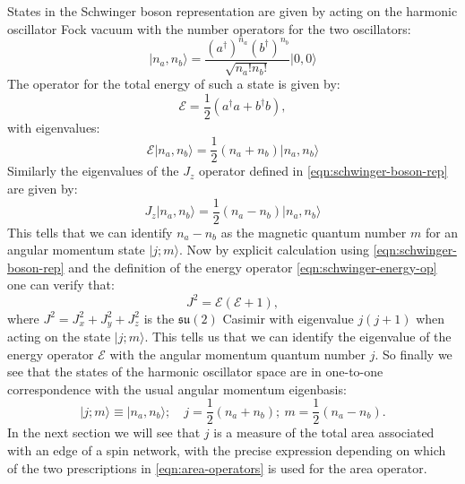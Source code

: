 \documentclass[twocolumn,draft,aps,nofootinbib,nobibnotes,final]{revtex4-2}
\newcommand{\mc}[1]{\mathcal{#1}}
\newcommand{\mf}[1]{\mathfrak{#1}}
\newcommand{\ket}[1]{\vert #1 \rangle}
\newcommand{\onehalf}{\frac{1}{2}}
\begin{document}
States in the Schwinger boson representation are given by acting on the harmonic oscillator Fock vacuum with the number operators for the two oscillators:
\begin{equation}\label{eqn:schwinger-states}
	\ket{n_a, n_b} = \frac{(a^\dag)^{n_a} (b^\dag)^{n_b}}{\sqrt{n_a ! n_b !}}\ket{0,0}
\end{equation}
The operator for the total energy of such a state is given by:
\begin{equation}\label{eqn:schwinger-energy-op}
	\mc{E} = \onehalf(a^\dag a + b^\dag b),
\end{equation}
with eigenvalues:
\begin{equation}\label{eqn:schwinger-energy-eigenvalues}
	\mc{E} \ket{n_a, n_b} = \onehalf (n_a + n_b) \ket{n_a, n_b}
\end{equation}
Similarly the eigenvalues of the $ J_z $ operator defined in \eqref{eqn:schwinger-boson-rep} are given by:
\begin{equation}\label{eqn:j-z-defn}
	J_z \ket{n_a, n_b} = \onehalf (n_a - n_b) \ket{n_a, n_b}
\end{equation}
This tells that we can identify $ n_a - n_b $ as the magnetic quantum number $ m $ for an angular momentum state $ \ket{j;m} $. Now by explicit calculation using \eqref{eqn:schwinger-boson-rep} and the definition of the energy operator \eqref{eqn:schwinger-energy-op} one can verify that:
\begin{equation}\label{eqn:j-square-defn}
	J^2 = \mc{E}(\mc{E}+1),
\end{equation}
where $ J^2 = J_x^2 + J_y^2 + J_z^2 $ is the $ \mf{su}(2) $ Casimir with eigenvalue $ j(j+1) $ when acting on the state $ \ket{j;m} $. This tells us that we can identify the eigenvalue of the energy operator $ \mc{E} $ with the angular momentum quantum number $ j $. So finally we see that the states of the harmonic oscillator space are in one-to-one correspondence with the usual angular momentum eigenbasis:
\begin{equation}\label{eqn:state-correspondence}
	\ket{j;m} \equiv \ket{n_a, n_b}; \quad j = \onehalf(n_a + n_b);~ m = \onehalf(n_a - n_b).
\end{equation}
In the next section we will see that $ j $  is a measure of the total area associated with an edge of a spin network, with the precise expression depending on which of the two prescriptions in \eqref{eqn:area-operators} is used for the area operator.
\end{document}
